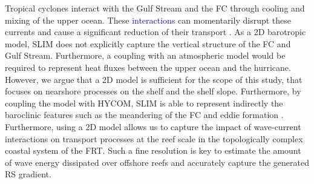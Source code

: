 \documentclass[preprint,12pt,authoryear]{elsarticle}
\newcommand{\modif}[1]{\textcolor{blue}{#1}}
\begin{document}
Tropical cyclones interact with the Gulf Stream and the FC through cooling and mixing of the upper ocean. These \modif{interactions} can momentarily disrupt these currents and cause a significant reduction of their transport \citep{oey2007hurricane,ezer2017observations,ezer2020long}. As a 2D barotropic model, SLIM does not explicitly capture the vertical structure of the FC and Gulf Stream. Furthermore, a coupling with an atmospheric model would be required to represent heat fluxes between the upper ocean and the hurricane. However, we argue that a 2D model is sufficient for the scope of this study, that focuses on nearshore processes on the shelf and the shelf slope. Furthermore, by coupling the model with HYCOM, SLIM is able to represent indirectly the baroclinic features such as the meandering of the FC and eddie formation \citep{frys2020fine}. Furthermore, using a 2D model allows us to capture the impact of wave-current interactions on transport processes at the reef scale in the topologically complex coastal system of the FRT. Such a fine resolution is key to estimate the amount of wave energy dissipated over offshore reefs and accurately capture the generated RS gradient.

\end{document}
